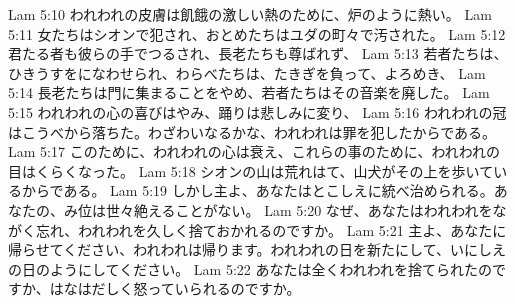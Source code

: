 Lam 5:10  われわれの皮膚は飢餓の激しい熱のために、炉のように熱い。
Lam 5:11  女たちはシオンで犯され、おとめたちはユダの町々で汚された。
Lam 5:12  君たる者も彼らの手でつるされ、長老たちも尊ばれず、
Lam 5:13  若者たちは、ひきうすをになわせられ、わらべたちは、たきぎを負って、よろめき、
Lam 5:14  長老たちは門に集まることをやめ、若者たちはその音楽を廃した。
Lam 5:15  われわれの心の喜びはやみ、踊りは悲しみに変り、
Lam 5:16  われわれの冠はこうべから落ちた。わざわいなるかな、われわれは罪を犯したからである。
Lam 5:17  このために、われわれの心は衰え、これらの事のために、われわれの目はくらくなった。
Lam 5:18  シオンの山は荒れはて、山犬がその上を歩いているからである。
Lam 5:19  しかし主よ、あなたはとこしえに統べ治められる。あなたの、み位は世々絶えることがない。
Lam 5:20  なぜ、あなたはわれわれをながく忘れ、われわれを久しく捨ておかれるのですか。
Lam 5:21  主よ、あなたに帰らせてください、われわれは帰ります。われわれの日を新たにして、いにしえの日のようにしてください。
Lam 5:22  あなたは全くわれわれを捨てられたのですか、はなはだしく怒っていられるのですか。


